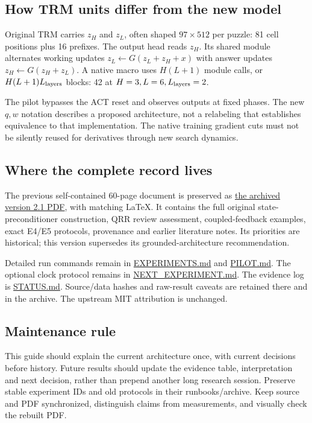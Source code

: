 \documentclass[11pt,a4paper]{article}
\newcommand{\repo}[2]{\href{https://github.com/NiccoGrillo/TinyRecursiveModels/blob/main/#1}{#2}}
\begin{document}
\newpage
\subsection{How TRM units differ from the new model}
Original TRM carries $z_H$ and $z_L$, often shaped $97\times512$ per puzzle: 81 cell positions plus 16 prefixes. The output head reads $z_H$. Its shared module alternates working updates $z_L\leftarrow G(z_L+z_H+x)$ with answer updates $z_H\leftarrow G(z_H+z_L)$. A native macro uses $H(L+1)$ module calls, or $H(L+1)L_{\rm layers}$ blocks: 42 at $H=3,L=6,L_{\rm layers}=2$.

The pilot bypasses the ACT reset and observes outputs at fixed phases. The new $q,w$ notation describes a proposed architecture, not a relabeling that establishes equivalence to that implementation. The native training gradient cuts must not be silently reused for derivatives through new search dynamics.

\subsection{Where the complete record lives}
The previous self-contained 60-page document is preserved as
\repo{docs/notebook/archive/project_notebook_v2_1.pdf}{the archived version 2.1 PDF}, with matching LaTeX. It contains the full original state-preconditioner construction, QRR review assessment, coupled-feedback examples, exact E4/E5 protocols, provenance and earlier literature notes. Its priorities are historical; this version supersedes its grounded-architecture recommendation.

Detailed run commands remain in \repo{docs/EXPERIMENTS.md}{EXPERIMENTS.md} and \repo{docs/PILOT.md}{PILOT.md}. The optional clock protocol remains in \repo{docs/NEXT_EXPERIMENT.md}{NEXT\_EXPERIMENT.md}. The evidence log is \repo{docs/STATUS.md}{STATUS.md}. Source/data hashes and raw-result caveats are retained there and in the archive. The upstream MIT attribution is unchanged.

\subsection{Maintenance rule}
This guide should explain the current architecture once, with current decisions before history. Future results should update the evidence table, interpretation and next decision, rather than prepend another long research session. Preserve stable experiment IDs and old protocols in their runbooks/archive. Keep source and PDF synchronized, distinguish claims from measurements, and visually check the rebuilt PDF.
\end{document}
